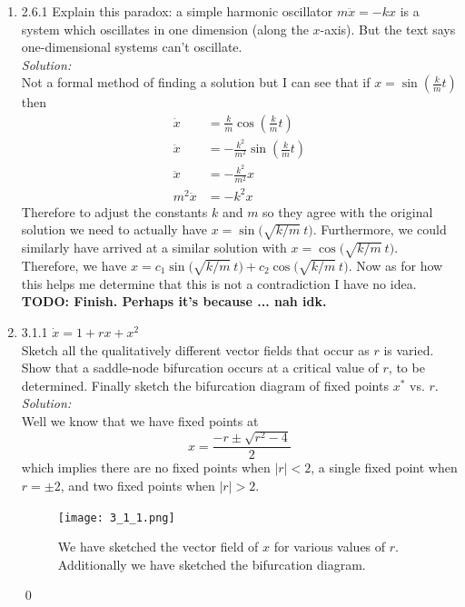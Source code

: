 \documentclass[10pt]{amsart}
\theoremstyle{nonumberplain}
\begin{document}
\begin{enumerate}[label={\bf {\arabic*}:}]
\item 2.6.1 Explain this paradox: a simple harmonic oscillator $m\ddot {x} = -k x$ is a system which oscillates in one dimension (along the $x$-axis). But the text says one-dimensional systems can't oscillate. \\

\noindent
\textit{Solution:} \\
Not a formal method of finding a solution but I can see that if $x = \sin \left(  \frac k m t \right)$ then
\begin{align*}
\dot x &= \frac k m \cos \left(  \frac k m t \right) \\
\ddot x &= - \frac {k^2} {m^2} \sin \left(  \frac k m t \right) \\
\ddot x &= - \frac {k^2} {m^2} x \\
m^2\ddot x &= - k^2 x
\end{align*}
Therefore to adjust the constants $k$ and $m$ so they agree with the original solution we need to actually have $x = \sin \big(  \sqrt {k/m} \: t \big)$.
Furthermore, we could similarly have arrived at a similar solution with $x = \cos \big(  \sqrt {k/m} \: t \big)$.
Therefore, we have $x = c_1 \sin \big(  \sqrt {k/m} \: t \big) + c_2 \cos \big(  \sqrt {k/m} \: t \big)$. 
Now as for how this helps me determine that this is not a contradiction I have no idea. \\
\textbf{TODO: Finish. Perhaps it's because ... nah idk. } \\

\newpage

\item 3.1.1 $\dot x = 1 + rx + x^2$ \\
Sketch all the qualitatively different vector fields that occur as $r$ is varied.
Show that a saddle-node bifurcation occurs at a critical value of $r$, to be determined.
Finally sketch the bifurcation diagram of fixed points $x^*$ vs. $r$. \\

\noindent
\textit{Solution:} \\
Well we know that we have fixed points at
$$x = \frac {-r \pm \sqrt {r^2 - 4}}{2}$$
which implies there are no fixed points when $|r| < 2$, a single fixed point when $r = \pm 2$, and two fixed points when $|r| > 2$.

\begin{figure}[h]
	\centering
	\texttt{[image: 3\_1\_1.png]}
 	\caption{We have sketched the vector field of $x$ for various values of $r$. Additionally we have sketched the bifurcation diagram.}\label{fig:f1}
\end{figure}
\qed \\


\end{enumerate}
\end{document}
